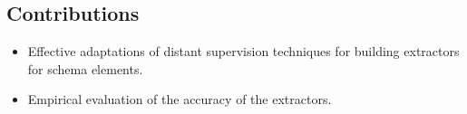 



\subsection{Contributions}

\begin{itemize}
\item Effective adaptations of distant supervision techniques for building extractors for schema elements.
\item Empirical evaluation of the accuracy of the extractors. 
\end{itemize}

